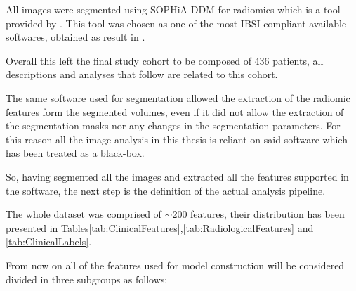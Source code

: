 All images were segmented using SOPHiA DDM for radiomics \cite{Sophiarad} which is a tool provided by \orsola.
This tool was chosen as one of the most IBSI-compliant available softwares, obtained as result in \cite{IBSI-Compliance}.

Overall this left the final study cohort to be composed of 436 patients, all descriptions and analyses that follow are related to this cohort.

The same software used for segmentation allowed the extraction of the radiomic features form the segmented volumes, even if it did not allow the extraction of the segmentation masks nor any changes in the segmentation parameters. For this reason all the image analysis in this thesis is reliant on said software which has been treated as a black-box.

So, having segmented all the images and extracted all the features supported in the software, the next step is the definition of the actual analysis pipeline.

The whole dataset was comprised of $\sim$200 features, their distribution has been presented in Tables\ref{tab:ClinicalFeatures},\ref{tab:RadiologicalFeatures} and \ref{tab:ClinicalLabels}.

From now on all of the features used for model construction will be considered divided in three subgroups as follows:

